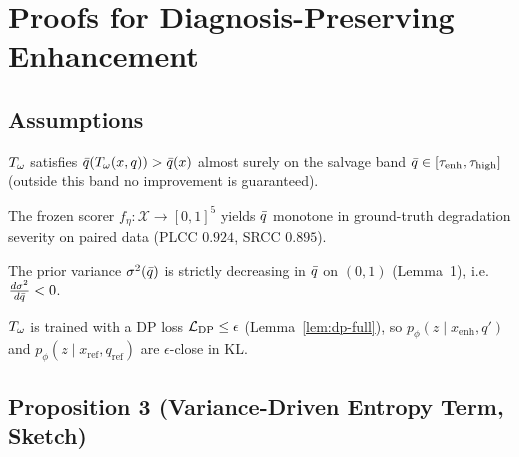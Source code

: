 
\section{Proofs for Diagnosis-Preserving Enhancement}\label{app:a2}

\subsection{Assumptions}\label{app:a2-assump}
\begin{assumption}\label{as:a1}
$T_\omega$ satisfies $\bar{q}(T_\omega(x,q)) > \bar{q}(x)$ almost surely on the salvage band
$\bar{q}\in[\tau_{\mathrm{enh}},\tau_{\mathrm{high}}]$ (outside this band no improvement is guaranteed).
\end{assumption}
\begin{assumption}\label{as:a2}
The frozen scorer $f_\eta:\mathcal{X}\to[0,1]^5$ yields $\bar{q}$ monotone in ground-truth
degradation severity on paired data (PLCC $0.924$, SRCC $0.895$).
\end{assumption}
\begin{assumption}\label{as:a3}
The \qvib{} prior variance $\sigma^2(\bar{q})$ is strictly decreasing in $\bar{q}$ on $(0,1)$
(Lemma~1), i.e.\ $\tfrac{d\sigma^2}{d\bar{q}} < 0$.
\end{assumption}
\begin{assumption}\label{as:a4}
$T_\omega$ is trained with a DP loss $\mathcal{L}_{\mathrm{DP}}\leq\epsilon$ (Lemma~\ref{lem:dp-full}), so
$p_\phi(z\mid x_{\mathrm{enh}},q')$ and $p_\phi(z\mid x_{\mathrm{ref}},q_{\mathrm{ref}})$
are $\epsilon$-close in KL.
\end{assumption}

\subsection{Proposition 3 (Variance-Driven Entropy Term, Sketch)}\label{app:a2-prop3}

